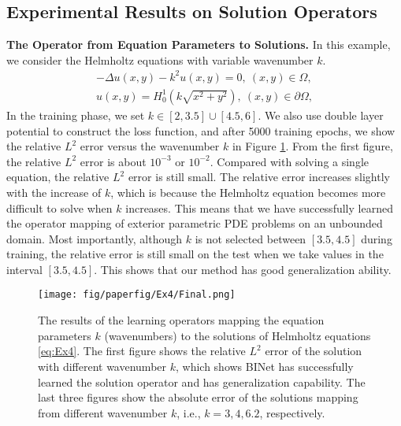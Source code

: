 \documentclass[hyperref]{article}
\numberwithin{equation}{section}
\theoremstyle{nonumberplain}
\begin{document}
	\subsection{Experimental Results on Solution Operators}
	\textbf{The Operator from Equation Parameters to Solutions.}
	In this example, we consider the Helmholtz equations with variable wavenumber $k$.
	\begin{equation}
		\begin{aligned}
			-\Delta u(x,y) - k^2u(x,y) = 0,\ (x,y)\in\Omega,\\
			u(x,y) = H_0^1(k\sqrt{x^2+y^2}), \ (x,y)\in\partial\Omega,
		\end{aligned}
		\label{eq:Ex4}
	\end{equation}
	In the training phase, we set $k\in[2,3.5]\cup[4.5,6]$. We also use double layer potential to construct the loss function, and after 5000 training epochs,  we show the relative $L^2$ error versus the wavenumber $k$ in Figure \ref{fig:Ex4}. From the first figure, the relative $L^2$ error is about $10^{-3}$ or $10^{-2}$. Compared with solving a single equation, the relative $L^2$ error is still small. The relative error increases slightly with the increase of $k$, which is because the Helmholtz equation becomes more difficult to solve when $k$ increases. This means that we have successfully learned the operator mapping of exterior parametric PDE problems on an unbounded domain. Most importantly, although $k$ is not selected between $[3.5,4.5]$ during training, the relative error is still small on the test when we take values in the interval $[3.5,4.5]$. This shows that our method has good generalization ability.
	\noindent
	\begin{figure}[t]
		\centering
		\texttt{[image: fig/paperfig/Ex4/Final.png]}
		\caption{The results of the learning operators mapping the equation parameters $k$ (wavenumbers) to the solutions of Helmholtz equations \eqref{eq:Ex4}. The first figure shows the relative $L^2$ error of the solution with different wavenumber $k$, which shows BINet has successfully learned the solution operator and has generalization capability. The last three figures show the absolute error of the solutions mapping from different wavenumber $k$, i.e., $k=3, 4, 6.2$, respectively.}
		\label{fig:Ex4}
	\end{figure}
	
	
	
\end{document}
